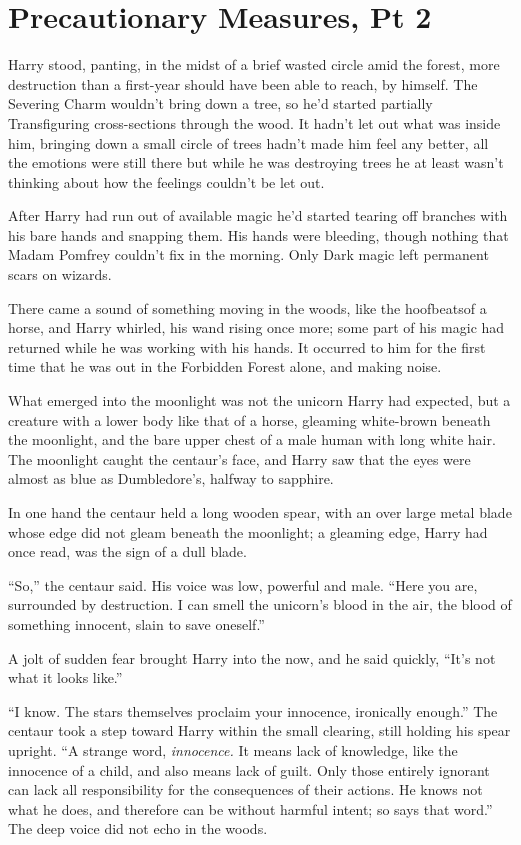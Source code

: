 \chapter{Precautionary Measures, Pt 2}

Harry stood, panting, in the midst of a brief wasted circle amid the forest, more destruction than a first-year should have been able to reach, by himself. The Severing Charm wouldn't bring down a tree, so he'd started partially Transfiguring cross-sections through the wood. It hadn't let out what was inside him, bringing down a small circle of trees hadn't made him feel any better, all the emotions were still there but while he was destroying trees he at least wasn't thinking about how the feelings couldn't be let out.

After Harry had run out of available magic he'd started tearing off branches with his bare hands and snapping them. His hands were bleeding, though nothing that Madam Pomfrey couldn't fix in the morning. Only Dark magic left permanent scars on wizards.

There came a sound of something moving in the woods, like the hoofbeatsof a horse, and Harry whirled, his wand rising once more; some part of his magic had returned while he was working with his hands. It occurred to him for the first time that he was out in the Forbidden Forest alone, and making noise.

What emerged into the moonlight was not the unicorn Harry had expected, but a creature with a lower body like that of a horse, gleaming white-brown beneath the moonlight, and the bare upper chest of a male human with long white hair. The moonlight caught the centaur's face, and Harry saw that the eyes were almost as blue as Dumbledore's, halfway to sapphire.

In one hand the centaur held a long wooden spear, with an over large metal blade whose edge did not gleam beneath the moonlight; a gleaming edge, Harry had once read, was the sign of a dull blade.

“So,” the centaur said. His voice was low, powerful and male. “Here you are, surrounded by destruction. I can smell the unicorn's blood in the air, the blood of something innocent, slain to save oneself.”

A jolt of sudden fear brought Harry into the now, and he said quickly, “It's not what it looks like.”

“I know. The stars themselves proclaim your innocence, ironically enough.” The centaur took a step toward Harry within the small clearing, still holding his spear upright. “A strange word, \emph{innocence.} It means lack of knowledge, like the innocence of a child, and also means lack of guilt. Only those entirely ignorant can lack all responsibility for the consequences of their actions. He knows not what he does, and therefore can be without harmful intent; so says that word.” The deep voice did not echo in the woods.

